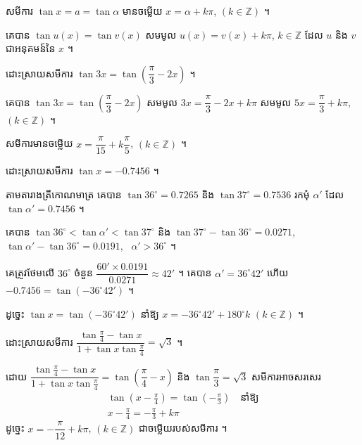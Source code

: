 \begin{formulaBox}[ដូច្នេះ]
សមីការ $\tan x = a = \tan\alpha$ មានចម្លើយ $x = \alpha + k\pi$, $(k \in \mathbb{Z})$ ។
\end{formulaBox}

\begin{note}[សម្គាល់]
គេបាន $\tan u(x) = \tan v(x)$ សមមូល $u(x) = v(x) + k\pi$, $k \in \mathbb{Z}$ ដែល $u$ និង $v$ ជាអនុគមន៍នៃ $x$ ។
\end{note}

\begin{example}[ឧទាហរណ៍ ៣]
ដោះស្រាយសមីការ $\tan 3x = \tan\left(\dfrac{\pi}{3} - 2x\right)$ ។

គេបាន $\tan 3x = \tan\left(\dfrac{\pi}{3} - 2x\right)$ សមមូល $3x = \dfrac{\pi}{3} - 2x + k\pi$ សមមូល $5x = \dfrac{\pi}{3} + k\pi$, $(k \in \mathbb{Z})$ ។

សមីការមានចម្លើយ $x = \dfrac{\pi}{15} + k\dfrac{\pi}{5}$, $(k \in \mathbb{Z})$ ។
\end{example}

\begin{example}[លំហាត់គំរូ ៥]
ដោះស្រាយសមីការ $\tan x = -0.7456$ ។
\end{example}
\ans
តាមតារាងត្រីកោណមាត្រ គេបាន $\tan 36^\circ = 0.7265$ និង $\tan 37^\circ = 0.7536$ រកមុំ $\alpha'$ ដែល $\tan\alpha' = 0.7456$ ។

គេបាន $\tan 36^\circ < \tan\alpha' < \tan 37^\circ$ និង $\tan 37^\circ - \tan 36^\circ = 0.0271$, \ $\tan\alpha' - \tan 36^\circ = 0.0191$, \ $\alpha' > 36^\circ$ ។

គេត្រូវថែមលើ $36^\circ$ ចំនួន $\dfrac{60' \times 0.0191}{0.0271} \approx 42'$ ។ គេបាន $\alpha' = 36^\circ 42'$ ហើយ $-0.7456 = \tan(-36^\circ 42')$ ។

ដូច្នេះ $\tan x = \tan(-36^\circ 42')$ នាំឱ្យ $x = -36^\circ 42' + 180^\circ k$ $(k \in \mathbb{Z})$ ។

\begin{example}[លំហាត់គំរូ ៦]
ដោះស្រាយសមីការ $\dfrac{\tan\frac{\pi}{4} - \tan x}{1 + \tan x\tan\frac{\pi}{4}} = \sqrt{3}$ ។
\end{example}
\ans
ដោយ $\dfrac{\tan\frac{\pi}{4} - \tan x}{1 + \tan x\tan\frac{\pi}{4}} = \tan\left(\dfrac{\pi}{4} - x\right)$ និង $\tan\dfrac{\pi}{3} = \sqrt{3}$ សមីការអាចសរសេរ
\[
\begin{gathered}
\tan\left(x - \frac{\pi}{4}\right) = \tan\left(-\frac{\pi}{3}\right) \quad \text{នាំឱ្យ}\\
x - \frac{\pi}{4} = -\frac{\pi}{3} + k\pi
\end{gathered}
\]
ដូច្នេះ $x = -\dfrac{\pi}{12} + k\pi$, $(k \in \mathbb{Z})$ ជាចម្លើយរបស់សមីការ ។

